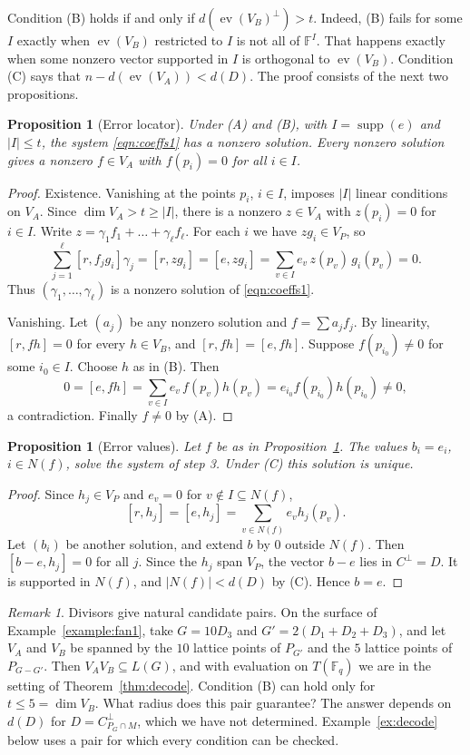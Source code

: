 \documentclass[12pt,letterpaper]{article}
\numberwithin{equation}{section}
\newtheorem{proposition}[theorem]{Proposition}
\theoremstyle{definition}
\theoremstyle{remark}
\newtheorem{remark}[theorem]{Remark}
\DeclareMathOperator{\supp}{supp}
\DeclareMathOperator{\ev}{ev}
\newcommand{\F}{\mathbb{F}}
\newcommand{\Fq}{\mathbb{F}_q}
\begin{document}
Condition (B) holds if and only if $d(\ev(V_B)^\perp)>t$. Indeed, (B) fails
for some $I$ exactly when $\ev(V_B)$ restricted to $I$ is not all of $\F^I$.
That happens exactly when some nonzero vector supported in $I$ is orthogonal
to $\ev(V_B)$. Condition (C) says that $n-d(\ev(V_A))<d(D)$. The proof
consists of the next two propositions.

\begin{proposition}[Error locator]\label{prop:errorlocator}
Under (A) and (B), with $I=\supp(e)$ and $|I|\le t$, the system
\eqref{eqn:coeffs1} has a nonzero solution. Every nonzero solution gives a
nonzero $f\in V_A$ with $f(p_i)=0$ for all $i\in I$.
\end{proposition}

\begin{proof}
Existence. Vanishing at the points $p_i$, $i\in I$, imposes $|I|$ linear
conditions on $V_A$. Since $\dim V_A>t\ge|I|$, there is a nonzero $z\in V_A$
with $z(p_i)=0$ for $i\in I$. Write $z=\gamma_1f_1+\dots+\gamma_\ell f_\ell$.
For each $i$ we have $zg_i\in V_P$, so
\[
\sum_{j=1}^{\ell}[r,f_jg_i]\gamma_j=[r,zg_i]=[e,zg_i]
=\sum_{v\in I}e_v\,z(p_v)\,g_i(p_v)=0 .
\]
Thus $(\gamma_1,\dots,\gamma_\ell)$ is a nonzero solution of
\eqref{eqn:coeffs1}.

Vanishing. Let $(a_j)$ be any nonzero solution and $f=\sum a_jf_j$. By
linearity, $[r,fh]=0$ for every $h\in V_B$, and $[r,fh]=[e,fh]$. Suppose
$f(p_{i_0})\ne0$ for some $i_0\in I$. Choose $h$ as in (B). Then
\[
0=[e,fh]=\sum_{v\in I}e_v\,f(p_v)h(p_v)=e_{i_0}f(p_{i_0})h(p_{i_0})\ne0,
\]
a contradiction. Finally $f\ne0$ by (A).
\end{proof}

\begin{proposition}[Error values]\label{prop:errors}
Let $f$ be as in Proposition~\ref{prop:errorlocator}. The values $b_i=e_i$,
$i\in N(f)$, solve the system of step 3. Under (C) this solution is unique.
\end{proposition}

\begin{proof}
Since $h_j\in V_P$ and $e_v=0$ for $v\notin I\subseteq N(f)$,
\[
[r,h_j]=[e,h_j]=\sum_{v\in N(f)}e_vh_j(p_v).
\]
Let $(b_i)$ be another solution, and extend $b$ by $0$ outside $N(f)$. Then
$[b-e,h_j]=0$ for all $j$. Since the $h_j$ span $V_P$, the vector $b-e$ lies in
$C^\perp=D$. It is supported in $N(f)$, and $|N(f)|<d(D)$ by (C). Hence
$b=e$.
\end{proof}

\begin{remark}\label{rem:oldexample}
Divisors give natural candidate pairs. On the surface of
Example~\ref{example:fan1}, take $G=10D_3$ and $G'=2(D_1+D_2+D_3)$, and let
$V_A$ and $V_B$ be spanned by the $10$ lattice points of $P_{G'}$ and the $5$
lattice points of $P_{G-G'}$. Then $V_AV_B\subseteq L(G)$, and with evaluation
on $T(\Fq)$ we are in the setting of Theorem~\ref{thm:decode}. Condition (B)
can hold only for $t\le5=\dim V_B$. What radius does this pair guarantee? The
answer depends on $d(D)$ for $D=C_{P_G\cap M}^\perp$, which we have not
determined. Example~\ref{ex:decode} below uses a pair for which every
condition can be checked.
\end{remark}
\end{document}
